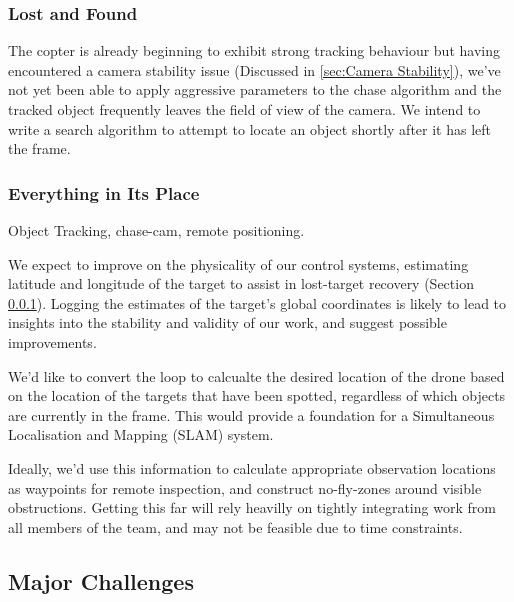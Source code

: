 \documentclass[a4paper, 11pt, titlepage]{article}
\begin{document}

    \subsubsection{Lost and Found}
    \label{sec:Lost and Found}
      The copter is already beginning to exhibit strong tracking behaviour but having encountered a camera stability issue (Discussed in \ref{sec:Camera Stability}), we've not yet been able to apply aggressive parameters to the chase algorithm and the tracked object frequently leaves the field of view of the camera.
      We intend to write a search algorithm to attempt to locate an object shortly after it has left the frame.


    \subsubsection{Everything in Its Place}      
      Object Tracking, chase-cam, remote positioning.

      We expect to improve on the physicality of our control systems, estimating latitude and longitude of the target to assist in lost-target recovery (Section \ref{sec:Lost and Found}).  Logging the estimates of the target's global coordinates is likely to lead to insights into the stability and validity of our work, and suggest possible improvements.

      We'd like to convert the loop to calcualte the desired location of the drone based on the location of the targets that have been spotted, regardless of which objects are currently in the frame.  This would provide a foundation for a Simultaneous Localisation and Mapping (SLAM) system.

      Ideally, we'd use this information to calculate appropriate observation locations as waypoints for remote inspection, and construct no-fly-zones around visible obstructions.  Getting this far will rely heavilly on tightly integrating work from all members of the team, and may not be feasible due to time constraints.

  \subsection{Major Challenges}
\end{document}

